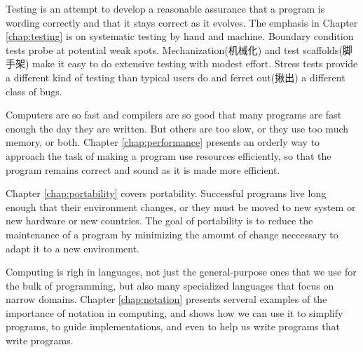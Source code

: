 Testing is an attempt to develop a reasonable assurance that a program is
wording correctly and that it stays correct as it evolves. The emphasis in
Chapter \ref{chap:testing} is on systematic testing by hand and machine.
Boundary condition tests probe at potential weak spots.
Mechanization(机械化) and test scaffolds(脚手架) make it easy to do
extensive testing with modest effort.  Stress tests provide a different
kind of testing than typical users do and ferret out(揪出) a different
class of bugs.

Computers are so fast and compilers are so good that many programs are fast
enough the day they are written. But others are too slow, or they use too
much memory, or both. Chapter \ref{chap:performance} presents an orderly
way to approach the task of making a program use resources efficiently, so
that the program remains correct and sound as it is made more efficient.

Chapter \ref{chap:portability} covers portability. Successful programs live
long enough that their environment changes, or they must be moved to new
system or new hardware or new countries. The goal of portability is to
reduce the maintenance of a program by minimizing the amount of change
neccessary to adapt it to a new environment.

Computing is righ in languages, not just the general-purpose ones that we
use for the bulk of programming, but also many specialized languages that
focus on narrow domains. Chapter \ref{chap:notation} presents serveral
examples of the importance of notation in computing, and shows how we can
use it to simplify programs, to guide implementations, and even to help us
write programs that write programs.


